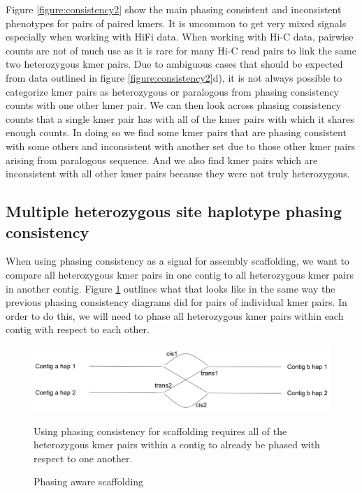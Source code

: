\par{
Figure \ref{figure:consistency2} show the main phasing consistent and inconsistent phenotypes for pairs of paired kmers. It is uncommon to get very mixed signals especially when working with HiFi data. When working with Hi-C data, pairwise counts are not of much use as it is rare for many Hi-C read pairs to link the same two heterozygous kmer pairs. Due to ambiguous cases that should be expected from data outlined in figure \ref{figure:consistency2}d), it is not always possible to categorize kmer pairs as heterozygous or paralogous from phasing consistency counts with one other kmer pair. We can then look across phasing consistency counts that a single kmer pair has with all of the kmer pairs with which it shares enough counts. In doing so we find some kmer pairs that are phasing consistent with some others and inconsistent with another set due to those other kmer pairs arising from paralogous sequence. And we also find kmer pairs which are inconsistent with all other kmer pairs because they were not truly heterozygous.
}



\subsection{Multiple heterozygous site haplotype phasing consistency}

\par{
When using phasing consistency as a signal for assembly scaffolding, we want to compare all heterozygous kmer pairs in one contig to all heterozygous kmer pairs in another contig. Figure \ref{figure:scaff} outlines what that looks like in the same way the previous phasing consistency diagrams did for pairs of individual kmer pairs. In order to do this, we will need to phase all heterozygous kmer pairs within each contig with respect to each other.
}

\begin{figure}[htbp!]
\caption{Phasing aware scaffolding}
\label{figure:scaff}
\begin{centering}
\includegraphics[width=\textwidth]{phasescaff.png}
\par{Using phasing consistency for scaffolding requires all of the heterozygous kmer pairs within a contig to already be phased with respect to one another.}
\end{centering}
\end{figure}



